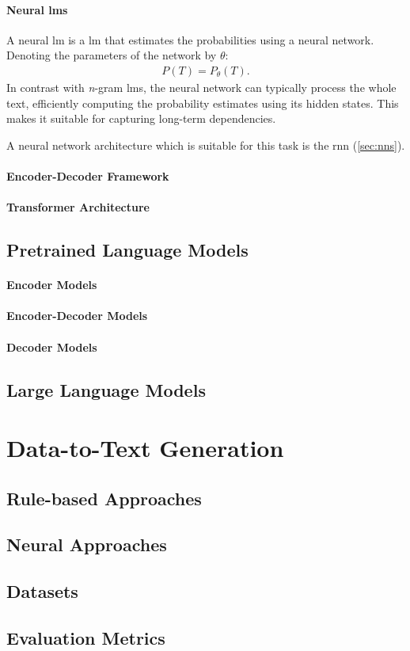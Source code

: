\paragraph{Neural \acp{lm}} A neural \ac{lm} is a \acl{lm} that estimates the probabilities using a neural network. Denoting the parameters of the network by $\theta$:
\begin{align}
    P(T) = P_\theta(T).
\end{align}
In contrast with \emph{n}-gram \acp{lm}, the neural network can typically process the whole text, efficiently computing the probability estimates using its hidden states. This makes it suitable for capturing long-term dependencies.

A neural network architecture which is suitable for this task is the \ac{rnn} (\autoref{sec:nns}).


\paragraph{Encoder-Decoder Framework}

\paragraph{Transformer Architecture}
\subsection{Pretrained Language Models}
\label{sec:plms}

\paragraph{Encoder Models}

\paragraph{Encoder-Decoder Models}

\paragraph{Decoder Models}

\subsection{Large Language Models}
\label{sec:llms}
\section{Data-to-Text Generation}
\label{sec:d2t}
\subsection{Rule-based Approaches}
\label{sec:rule-d2t}
\subsection{Neural Approaches}
\label{sec:neural-d2t}
\subsection{Datasets}
\label{sec:datasets}
\subsection{Evaluation Metrics}
\label{sec:evaluation}